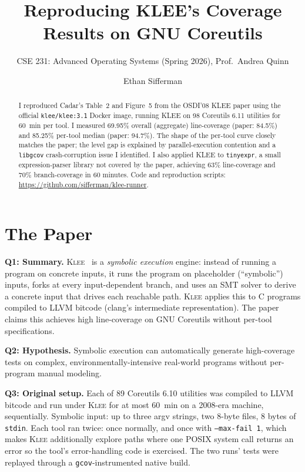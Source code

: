 \documentclass[sigconf,nonacm,10pt]{acmart}
\title{Reproducing KLEE's Coverage Results on GNU Coreutils}
\subtitle{CSE 231: Advanced Operating Systems (Spring 2026), Prof.\ Andrea Quinn}
\author{Ethan Sifferman}
\affiliation{%
  \institution{University of California, Santa Cruz}
}
\newcommand{\Q}[2]{\textbf{Q#1: #2.}\;}
\begin{document}
\begin{abstract}
I reproduced Cadar's Table~2 and Figure~5 from the OSDI'08 KLEE
paper using the official \texttt{klee/klee:3.1} Docker image,
running KLEE on 98 Coreutils 6.11 utilities for 60~min per tool.
I measured 69.95\% overall (aggregate) line-coverage (paper: 84.5\%) and
85.25\% per-tool median (paper: 94.7\%). The shape of the per-tool
curve closely matches the paper; the level gap is explained by
parallel-execution contention and a \texttt{libgcov}
crash-corruption issue I identified. I also applied KLEE to
\texttt{tinyexpr}, a small expression-parser library not covered
by the paper, achieving 63\% line-coverage and 70\% branch-coverage in 60 minutes.
Code and reproduction scripts:
\url{https://github.com/sifferman/klee-runner}.
\end{abstract}

\maketitle

\section{The Paper}

\Q{1}{Summary} \textsc{Klee}~\cite{cadar2008klee} is a
\emph{symbolic execution} engine: instead of running a program on
concrete inputs, it runs the program on placeholder
(``symbolic'') inputs, forks at every input-dependent branch, and
uses an SMT solver to derive a concrete input that drives each
reachable path. \textsc{Klee} applies this to C programs compiled
to LLVM bitcode (clang's intermediate representation). The paper
claims this achieves high line-coverage on GNU Coreutils without
per-tool specifications.

\Q{2}{Hypothesis} Symbolic execution can automatically generate
high-coverage tests on complex, environmentally-intensive
real-world programs without per-program manual modeling.

\Q{3}{Original setup} Each of 89 Coreutils 6.10 utilities was
compiled to LLVM bitcode and run under \textsc{Klee} for at most
60~min on a 2008-era machine, sequentially. Symbolic input: up to
three argv strings, two 8-byte files, 8 bytes of \texttt{stdin}.
Each tool ran twice: once normally, and once with
\texttt{--max-fail 1}, which makes \textsc{Klee} additionally
explore paths where one POSIX system call returns an error so the
tool's error-handling code is exercised. The two runs' tests were
replayed through a \texttt{gcov}-instrumented native build.
\end{document}

